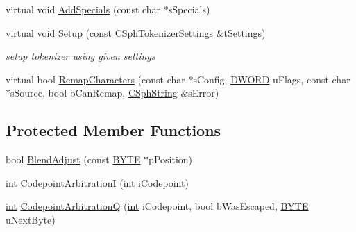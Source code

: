 \begin{DoxyCompactItemize}
virtual void \hyperlink{classCSphTokenizerBase_ab54e1cf1bf61515c45c49a43e3024f77}{Add\-Specials} (const char $\ast$s\-Specials)
\item 
virtual void \hyperlink{classCSphTokenizerBase_a07e154c27b1288dbfd461e20d4df3b62}{Setup} (const \hyperlink{structCSphTokenizerSettings}{C\-Sph\-Tokenizer\-Settings} \&t\-Settings)
\begin{DoxyCompactList}\small\item\em setup tokenizer using given settings \end{DoxyCompactList}\item 
virtual bool \hyperlink{classCSphTokenizerBase_a38ebf3137185ba00385f0de0b1ae8ab8}{Remap\-Characters} (const char $\ast$s\-Config, \hyperlink{sphinxstd_8h_a798af1e30bc65f319c1a246cecf59e39}{D\-W\-O\-R\-D} u\-Flags, const char $\ast$s\-Source, bool b\-Can\-Remap, \hyperlink{structCSphString}{C\-Sph\-String} \&s\-Error)
\end{DoxyCompactItemize}
\subsection*{Protected Member Functions}
\begin{DoxyCompactItemize}
\item 
bool \hyperlink{classCSphTokenizerBase_a65222404e1234c5372e5aaf776bb1e9b}{Blend\-Adjust} (const \hyperlink{sphinxstd_8h_a4ae1dab0fb4b072a66584546209e7d58}{B\-Y\-T\-E} $\ast$p\-Position)
\item 
\hyperlink{sphinxexpr_8cpp_a4a26e8f9cb8b736e0c4cbf4d16de985e}{int} \hyperlink{classCSphTokenizerBase_a77c993e080c944f26315bd402c95e100}{Codepoint\-Arbitration\-I} (\hyperlink{sphinxexpr_8cpp_a4a26e8f9cb8b736e0c4cbf4d16de985e}{int} i\-Codepoint)
\item 
\hyperlink{sphinxexpr_8cpp_a4a26e8f9cb8b736e0c4cbf4d16de985e}{int} \hyperlink{classCSphTokenizerBase_ada08a0a499421adea3438cc7a90fa332}{Codepoint\-Arbitration\-Q} (\hyperlink{sphinxexpr_8cpp_a4a26e8f9cb8b736e0c4cbf4d16de985e}{int} i\-Codepoint, bool b\-Was\-Escaped, \hyperlink{sphinxstd_8h_a4ae1dab0fb4b072a66584546209e7d58}{B\-Y\-T\-E} u\-Next\-Byte)
\end{DoxyCompactItemize}
